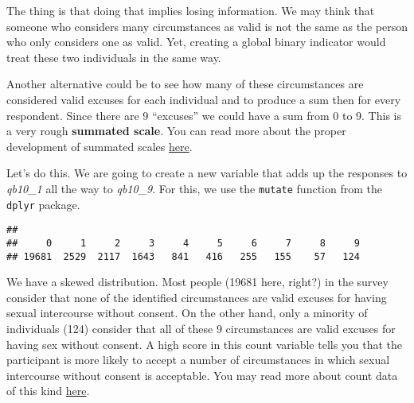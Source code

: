 \documentclass[
]{book}
\newenvironment{Shaded}{\begin{snugshade}}{\end{snugshade}}
\newcommand{\AttributeTok}[1]{\textcolor[rgb]{0.13,0.29,0.53}{#1}}
\newcommand{\FunctionTok}[1]{\textcolor[rgb]{0.13,0.29,0.53}{\textbf{#1}}}
\newcommand{\NormalTok}[1]{#1}
\newcommand{\OtherTok}[1]{\textcolor[rgb]{0.56,0.35,0.01}{#1}}
\newcommand{\SpecialCharTok}[1]{\textcolor[rgb]{0.81,0.36,0.00}{\textbf{#1}}}
\begin{document}
The thing is that doing that implies losing information. We may think that someone who considers many circumstances as valid is not the same as the person who only considers one as valid. Yet, creating a global binary indicator would treat these two individuals in the same way.

Another alternative could be to see how many of these circumstances are considered valid excuses for each individual and to produce a sum then for every respondent. Since there are 9 ``excuses'' we could have a sum from 0 to 9. This is a very rough \textbf{summated scale}. You can read more about the proper development of summated scales \href{https://pdfs.semanticscholar.org/aa84/dc485a07b920a957e9ef295e8dced8fa025c.pdf}{here}.

Let's do this. We are going to create a new variable that adds up the responses to \emph{qb10\_1} all the way to \emph{qb10\_9}. For this, we use the \texttt{mutate} function from the \texttt{dplyr} package.

\begin{Shaded}
\end{Shaded}

\begin{verbatim}
## 
##     0     1     2     3     4     5     6     7     8     9 
## 19681  2529  2117  1643   841   416   255   155    57   124
\end{verbatim}

We have a skewed distribution. Most people (19681 here, right?) in the survey consider that none of the identified circumstances are valid excuses for having sexual intercourse without consent. On the other hand, only a minority of individuals (124) consider that all of these 9 circumstances are valid excuses for having sex without consent. A high score in this count variable tells you that the participant is more likely to accept a number of circumstances in which sexual intercourse without consent is acceptable. You may read more about count data of this kind \href{https://en.wikipedia.org/wiki/Count_data}{here}.
\end{document}
